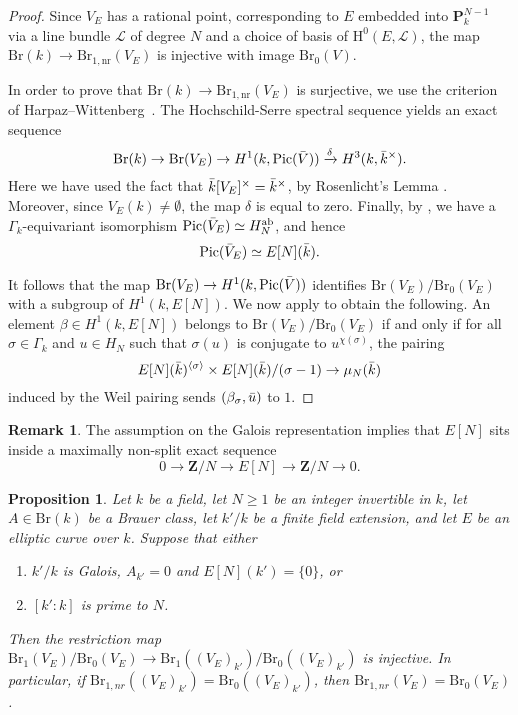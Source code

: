 \documentclass[10pt,letterpaper,twoside]{article}
\newcommand{\Lscr}{\mathcal{L}}
\renewcommand{\H}{\mathrm{H}}
\renewcommand{\1}{\mathbf{1}}
\newcommand{\bP}{\mathbf{P}}
\newcommand{\bZ}{\mathbf{Z}}
\newcommand{\nr}{\mathrm{nr}}
\renewcommand{\geq}{\geqslant}
\newcommand{\Pic}{\mathrm{Pic}}
\newcommand{\Br}{\mathrm{Br}}
\theoremstyle{plain}
\newtheorem{proposition}[theorem]{Proposition}
\theoremstyle{plain}
\theoremstyle{definition}
\theoremstyle{named}
\theoremstyle{definition}
\newtheorem{remark}[theorem]{Remark}
\begin{document}
	\begin{proof}
	Since $V_E$ has a rational point, corresponding to $E$ embedded into $\bP^{N-1}_k$ via a line bundle $\Lscr$ of degree $N$ and a choice of basis of $\H^0(E,\Lscr)$, the map
		$\Br(k)\rightarrow\Br_{1,\nr}(V_E)$ is injective with image $\Br_0(V)$. 
		
		In order to prove that $\Br(k)\rightarrow\Br_{1,\nr}(V_E)$ is surjective, we use the criterion of
		Harpaz--Wittenberg~\cite{harpaz-wittenberg-massey}. The Hochschild-Serre spectral sequence yields an exact sequence
		\[\Br(k)\to \Br(V_E)\to H^1(k,\Pic(\Bar{V}))\xrightarrow{\delta}H^3(k,\Bar{k}^\times).\]
		Here we have used the fact that $\Bar{k}[V_E]^\times=\Bar{k}^\times$, by Rosenlicht's Lemma \cite{}. Moreover, since $V_E(k)\neq \emptyset$, the map $\delta$ is equal to zero. Finally, by \cite{}, we have a $\Gamma_k$-equivariant isomorphism $\Pic(\Bar{V}_E)\simeq H^{\mathrm{ab}}_N$, and hence
		\[\Pic(\Bar{V}_E)\simeq E[N](\Bar{k}).\]
		
		It follows that the map $\Br(V_E)\to H^1(k,\Pic(\Bar{V}))$ identifies $\Br(V_E)/\Br_0(V_E)$ with a subgroup of $H^1(k,E[N])$. We now apply \cite[Proposition 3.3]{harpaz-wittenberg-massey} to obtain the following. An element $\beta\in H^1(k,E[N])$ belongs to $\Br(V_E)/\Br_0(V_E)$ if and only if for all $\sigma\in \Gamma_k$ and $u\in H_N$ such that $\sigma(u)$ is conjugate to $u^{\chi(\sigma)}$, the pairing
		\[E[N](\Bar{k})^{\langle\sigma\rangle}\times E[N](\Bar{k})/(\sigma-1)\to \mu_N(\Bar{k})\]
		induced by the Weil pairing sends $(\beta_{\sigma},\Bar{u})$ to $1$. 
	\end{proof}
	
	\begin{remark}
		The assumption on the Galois representation implies that $E[N]$ sits inside a maximally non-split exact sequence
		$$0\rightarrow\bZ/N\rightarrow E[N]\rightarrow\bZ/N\rightarrow 0.$$
	\end{remark}
	
	
	
	\begin{proposition}
	Let $k$ be a field, let $N\geq 1$ be an integer invertible in $k$, let $A\in \Br(k)$ be a Brauer class, let $k'/k$ be a finite field extension, and let $E$ be an elliptic curve over $k$. Suppose that either
	\begin{enumerate}
		\item $k'/k$ is Galois, $A_{k'}=0$ and $E[N](k')=\{0\}$, or
		\item $[k':k]$ is prime to $N$.
	\end{enumerate}
	Then the restriction map $\Br_1(V_E)/\Br_0(V_E)\to \Br_1((V_E)_{k'})/\Br_0((V_E)_{k'})$ is injective. In particular, if $\Br_{1,nr}((V_E)_{k'})=\Br_0((V_E)_{k'})$, then $\Br_{1,nr}(V_E)=\Br_0(V_E)$.
	\end{proposition}
	
\end{document}
